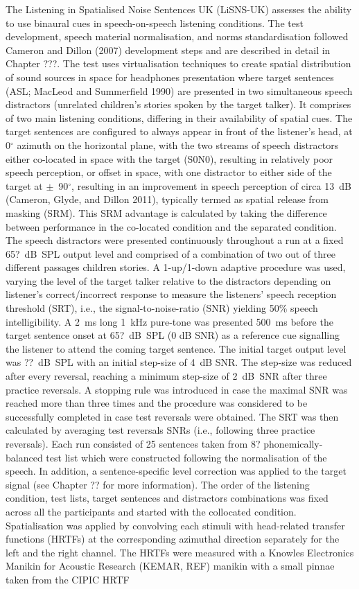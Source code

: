 \documentclass[a4paper,nobind]{templates/ociamthesis}
\begin{document}
The Listening in Spatialised Noise Sentences UK (LiSNS-UK) assesses the ability to use binaural cues in speech-on-speech listening conditions. The test development, speech material normalisation, and norms standardisation followed Cameron and Dillon (2007) development steps and are described in detail in Chapter ???. The test uses virtualisation techniques to create spatial distribution of sound sources in space for headphones presentation where target sentences (ASL; MacLeod and Summerfield 1990) are presented in two simultaneous speech distractors (unrelated children's stories spoken by the target talker). It comprises of two main listening conditions, differing in their availability of spatial cues. The target sentences are configured to always appear in front of the listener's head, at 0\(^{\circ}\) azimuth on the horizontal plane, with the two streams of speech distractors either co-located in space with the target (S0N0), resulting in relatively poor speech perception, or offset in space, with one distractor to either side of the target at \(\pm\)~90\(^{\circ}\), resulting in an improvement in speech perception of circa 13~dB (Cameron, Glyde, and Dillon 2011), typically termed as spatial release from masking (SRM). This SRM advantage is calculated by taking the difference between performance in the co-located condition and the separated condition. The speech distractors were presented continuously throughout a run at a fixed 65?~dB~SPL output level and comprised of a combination of two out of three different passages children stories. A 1-up/1-down adaptive procedure was used, varying the level of the target talker relative to the distractors depending on listener's correct/incorrect response to measure the listeners' speech reception threshold (SRT), i.e., the signal-to-noise-ratio (SNR) yielding 50\% speech intelligibility. A 2~ms long 1~kHz pure-tone was presented 500~ms before the target sentence onset at 65?~dB~SPL (0 dB SNR) as a reference cue signalling the listener to attend the coming target sentence. The initial target output level was ??~dB~SPL with an initial step-size of 4~dB SNR. The step-size was reduced after every reversal, reaching a minimum step-size of 2~dB~SNR after three practice reversals. A stopping rule was introduced in case the maximal SNR was reached more than three times and the procedure was considered to be successfully completed in case test reversals were obtained. The SRT was then calculated by averaging test reversals SNRs (i.e., following three practice reversals). Each run consisted of 25 sentences taken from 8? phonemically-balanced test list which were constructed following the normalisation of the speech. In addition, a sentence-specific level correction was applied to the target signal (see Chapter ?? for more information). The order of the listening condition, test lists, target sentences and distractors combinations was fixed across all the participants and started with the collocated condition. Spatialisation was applied by convolving each stimuli with head-related transfer functions (HRTFs) at the corresponding azimuthal direction separately for the left and the right channel. The HRTFs were measured with a Knowles Electronics Manikin for Acoustic Research (KEMAR, REF) manikin with a small pinnae taken from the CIPIC HRTF 
\end{document}
